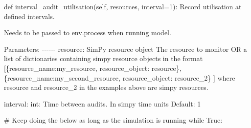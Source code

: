 \documentclass[
  letterpaper,
  DIV=11,
  numbers=noendperiod]{scrreprt}
\newenvironment{Shaded}{\begin{snugshade}}{\end{snugshade}}
\newcommand{\CommentTok}[1]{\textcolor[rgb]{0.37,0.37,0.37}{#1}}
\newcommand{\ControlFlowTok}[1]{\textcolor[rgb]{0.00,0.23,0.31}{#1}}
\newcommand{\DecValTok}[1]{\textcolor[rgb]{0.68,0.00,0.00}{#1}}
\newcommand{\KeywordTok}[1]{\textcolor[rgb]{0.00,0.23,0.31}{#1}}
\newcommand{\NormalTok}[1]{\textcolor[rgb]{0.00,0.23,0.31}{#1}}
\newcommand{\OperatorTok}[1]{\textcolor[rgb]{0.37,0.37,0.37}{#1}}
\newcommand{\VariableTok}[1]{\textcolor[rgb]{0.07,0.07,0.07}{#1}}
\begin{document}
\begin{tcolorbox}
\begin{Shaded}
\begin{Highlighting}[]
    \KeywordTok{def}\NormalTok{ interval\_audit\_utilisation(}\VariableTok{self}\NormalTok{, resources, interval}\OperatorTok{=}\DecValTok{1}\NormalTok{):}
        \CommentTok{\textquotesingle{}\textquotesingle{}\textquotesingle{}}
\CommentTok{        Record utilisation at defined intervals.}

\CommentTok{        Needs to be passed to env.process when running model.}

\CommentTok{        Parameters:}
\CommentTok{        {-}{-}{-}{-}{-}{-}}
\CommentTok{        resource: SimPy resource object}
\CommentTok{            The resource to monitor}
\CommentTok{            OR}
\CommentTok{            a list of dictionaries containing simpy resource objects in the format}
\CommentTok{            [\{\textquotesingle{}resource\_name\textquotesingle{}:\textquotesingle{}my\_resource\textquotesingle{}, \textquotesingle{}resource\_object\textquotesingle{}: resource\},}
\CommentTok{            \{\textquotesingle{}resource\_name\textquotesingle{}:\textquotesingle{}my\_second\_resource\textquotesingle{}, \textquotesingle{}resource\_object\textquotesingle{}: resource\_2\}}
\CommentTok{            ]}
\CommentTok{            where resource and resource\_2 in the examples above are simpy resources.}

\CommentTok{        interval: int:}
\CommentTok{            Time between audits.}
\CommentTok{            In simpy time units}
\CommentTok{            Default: 1}
\CommentTok{        \textquotesingle{}\textquotesingle{}\textquotesingle{}}

        \CommentTok{\# Keep doing the below as long as the simulation is running}
        \ControlFlowTok{while} \VariableTok{True}\NormalTok{:}


\end{Highlighting}
\end{Shaded}
\end{tcolorbox}
\end{document}
